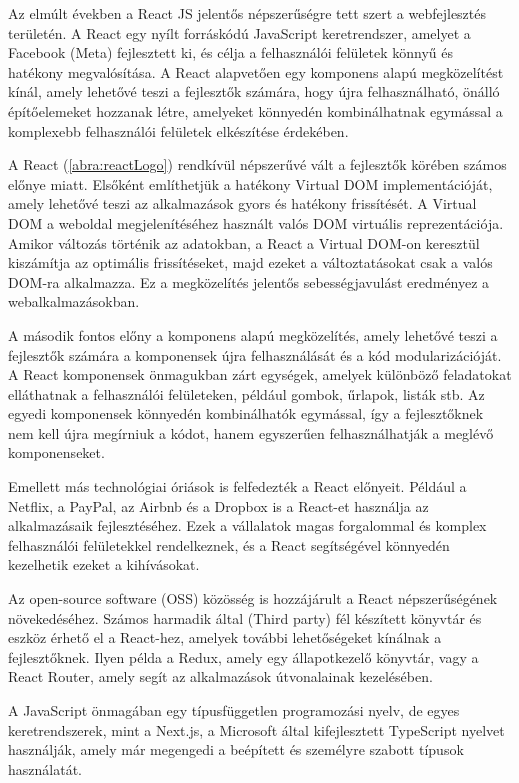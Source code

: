 Az elmúlt években a React JS jelentős népszerűségre tett szert a webfejlesztés területén. A React egy nyílt forráskódú JavaScript keretrendszer, amelyet a Facebook (Meta) fejlesztett ki, és célja a felhasználói felületek könnyű és hatékony megvalósítása. A React alapvetően egy komponens alapú megközelítést kínál, amely lehetővé teszi a fejlesztők számára, hogy újra felhasználható, önálló építőelemeket hozzanak létre, amelyeket könnyedén kombinálhatnak egymással a komplexebb felhasználói felületek elkészítése érdekében.

A React (\ref{abra:reactLogo}) rendkívül népszerűvé vált a fejlesztők körében számos előnye miatt. Elsőként említhetjük a hatékony Virtual DOM implementációját, amely lehetővé teszi az alkalmazások gyors és hatékony frissítését. A Virtual DOM a weboldal megjelenítéséhez használt valós DOM virtuális reprezentációja. Amikor változás történik az adatokban, a React a Virtual DOM-on keresztül kiszámítja az optimális frissítéseket, majd ezeket a változtatásokat csak a valós DOM-ra alkalmazza. Ez a megközelítés jelentős sebességjavulást eredményez a webalkalmazásokban.

A második fontos előny a komponens alapú megközelítés, amely lehetővé teszi a fejlesztők számára a komponensek újra felhasználását és a kód modularizációját. A React komponensek önmagukban zárt egységek, amelyek különböző feladatokat elláthatnak a felhasználói felületeken, például gombok, űrlapok, listák stb. Az egyedi komponensek könnyedén kombinálhatók egymással, így a fejlesztőknek nem kell újra megírniuk a kódot, hanem egyszerűen felhasználhatják a meglévő komponenseket.

Emellett más technológiai óriások is felfedezték a React előnyeit. Például a Netflix, a PayPal, az Airbnb és a Dropbox is a React-et használja az alkalmazásaik fejlesztéséhez. Ezek a vállalatok magas forgalommal és komplex felhasználói felületekkel rendelkeznek, és a React segítségével könnyedén kezelhetik ezeket a kihívásokat.

Az open-source software (OSS) közösség is hozzájárult a React népszerűségének növekedéséhez. Számos harmadik által (Third party) fél készített könyvtár és eszköz érhető el a React-hez, amelyek további lehetőségeket kínálnak a fejlesztőknek. Ilyen példa a Redux, amely egy állapotkezelő könyvtár, vagy a React Router, amely segít az alkalmazások útvonalainak kezelésében.

A JavaScript önmagában egy típusfüggetlen programozási nyelv, de egyes keretrendszerek, mint a Next.js, a Microsoft által kifejlesztett TypeScript nyelvet használják, amely már megengedi a beépített és személyre szabott típusok használatát.

